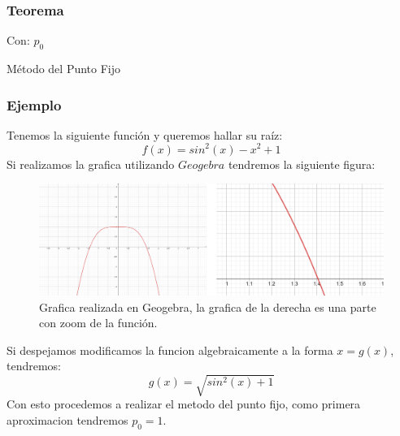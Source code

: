 \documentclass[10pt,letterpaper]{book}
\begin{document}
\subsubsection{Teorema}
\begin{center}
\end{center}

\begin{algorithm}[H]
  Con: 
   $p_0$ \\
 \caption{Método del Punto Fijo}
\end{algorithm}
\subsubsection*{Ejemplo}
Tenemos la siguiente función y queremos hallar su raíz:
	$$f(x)=sin^2(x)-x^2+1$$
Si realizamos la grafica utilizando $Geogebra$ tendremos la siguiente figura:
\begin{figure}[h]
\centering
\includegraphics[width=12cm]{puntofijo1}
\caption{Grafica realizada en Geogebra, la grafica de la derecha es una parte con zoom de la función.}
\end{figure}
Si despejamos modificamos la funcion algebraicamente a la forma $x=g(x)$, tendremos: 
$$g(x)= \sqrt{sin^2(x)+1}$$
Con esto procedemos a realizar el metodo del punto fijo, como primera aproximacion tendremos $p_0=1$. 
\end{document}
